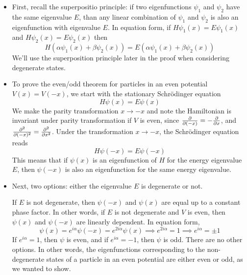 \documentclass[11pt, a4paper]{article}
\newcommand{\Schro}{Schr\"{o}dinger\xspace}
\begin{document}
\begin{itemize}
	\item First, recall the superpositio principle: if two eigenfunctions $ \psi_{1} $ and $ \psi_{2} $ have the same eigenvalue $ E $, than any linear combination of $ \psi_{1} $ and $ \psi_{2} $ is also an eigenfunction with eigenvalue $ E $. In equation form, if $ H\psi_{1}(x) = E \psi_{1}(x) $ and $ H\psi_{2}(x) = E \psi_{2}(x) $ then
	\begin{equation*}
		H\left(\alpha \psi_{1}(x) + \beta \psi_{2}(x)\right) = E \left(\alpha \psi_{1}(x) + \beta \psi_{2}(x)\right)
	\end{equation*}
	We'll use the superposition principle later in the proof when considering degenerate states.

	\item To prove the even/odd theorem for particles in an even potential $ V(x) = V(-x) $, we start with the stationary \Schro equation
	\begin{equation*}
		H\psi(x) = E \psi(x)
	\end{equation*}
	We make the parity transformation $ x \to -x $ and note the Hamiltonian is invariant under parity transformation if $ V $ is even, since $ \pdv{}{(-x)} = - \pdv{}{x} $, and $ \pdv[2]{}{(-x)} = \pdv[2]{}{x} $. Under the transformation $ x \to -x $, the \Schro equation reads
	\begin{equation*}
		H\psi(-x) = E\psi(-x)
	\end{equation*}
	This means that if $ \psi(x) $ is an eigenfunction of $ H $ for the energy eigenvalue $ E $, then $ \psi(-x) $ is also an eigenfunction for the same energy eigenvalue.
	
	\item Next, two options: either the eigenvalue $ E $ is degenerate or not.
	
	If $ E $ is not degenerate, then $ \psi(-x) $ and  $\psi(x) $ are equal up to a constant phase factor. In other words, if $ E $ is not degenerate and $ V $ is even, then $ \psi(x) $ and $ \psi(-x) $ are linearly dependent. In equation form,
	\begin{equation*}
		 \psi(x) = e^{i\alpha}\psi(-x) = e^{2i\alpha}\psi(x) \implies e^{2i\alpha} = 1 \implies e^{i\alpha} = \pm 1
	\end{equation*}
	If $ e^{i\alpha} = 1 $, then $ \psi $ is even, and if $ e^{i\alpha} = - 1 $, then $ \psi $ is odd. There are no other options. In other words, the eigenfunctions corresponding to the non-degenerate states of a particle in an even potential are either even or odd, as we wanted to show.
	

\end{itemize}
\end{document}
